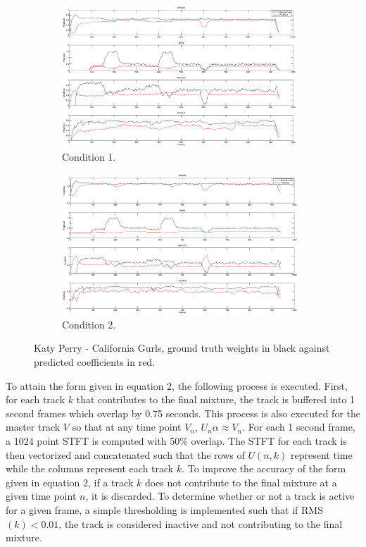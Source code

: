 \documentclass{article}
\begin{document}
\begin{figure}[!htbp]
\centering
\begin{subfigure}{\columnwidth}
\includegraphics[height=200px, width=\columnwidth]{kp_cg.eps}%
\caption{Condition 1.}
\label{subfiga}%
\end{subfigure}%
\begin{subfigure}{\columnwidth}
\includegraphics[height=200px, width=\columnwidth]{kp_cg_extrafeatures.eps}%
\caption{Condition 2.}
\label{subfigb}%
\end{subfigure}%
\caption{Katy Perry - California Gurls, ground truth weights in black against predicted coefficients in red.}
\label{fig:katyperrycoef}
\end{figure}

To attain the form given in equation 2, the following process is executed.  First, for each track $k$ that contributes to the final mixture, the track is buffered into 1 second frames which overlap by 0.75 seconds.  This process is also executed for the master track $V$ so that at any time point $V_n$, $U_n\alpha \approx V_n$.  For each 1 second frame, a 1024 point STFT is computed with 50\% overlap.  The STFT for each track is then vectorized and concatenated such that the rows of $U(n, k)$ represent time while the columns represent each track $k$.  To improve the accuracy of the form given in equation 2, if a track $k$ does not contribute to the final mixture at a given time point $n$, it is discarded.  To determine whether or not a track is active for a given frame, a simple thresholding is implemented such that if RMS$(k) < 0.01$, the track is considered inactive and not contributing to the final mixture.
\end{document}
